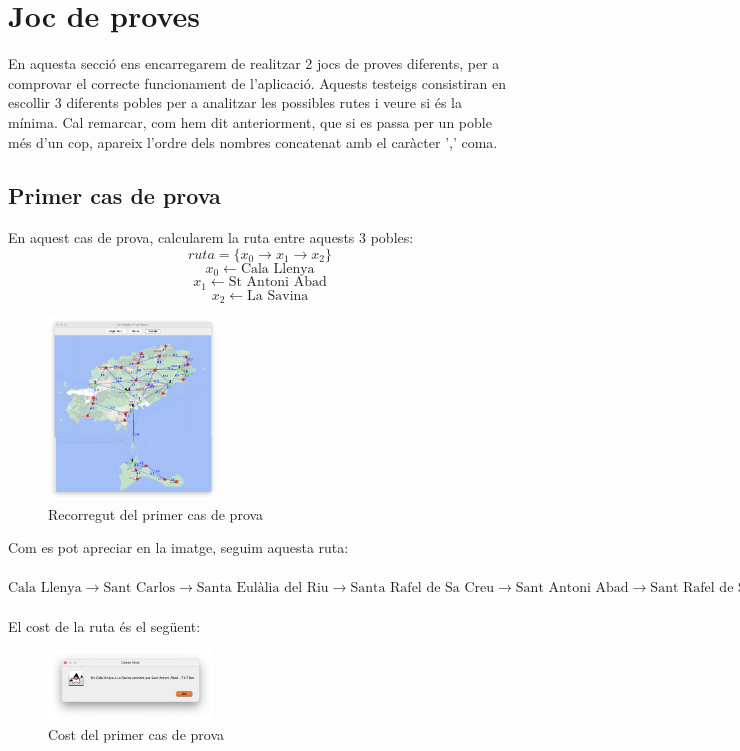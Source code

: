 \documentclass[conference]{IEEEtran}
\begin{document}
\section{Joc de proves}
    En aquesta secció ens encarregarem de realitzar 2 jocs de proves diferents, per a comprovar el correcte funcionament de l'aplicació. Aquests testeigs consistiran en escollir 3 diferents pobles per a analitzar les possibles rutes i veure si és la mínima. Cal remarcar, com hem dit anteriorment, que si es passa per un poble més d'un cop, apareix l'ordre dels nombres concatenat amb el caràcter ',' coma.
    \subsection{Primer cas de prova}
    En aquest cas de prova, calcularem la ruta entre aquests 3 pobles:
    $$ruta=\{x_{0}\rightarrow x_{1}\rightarrow x_{2}\}$$
    $$x_{0}\gets \textrm{Cala Llenya}$$
    $$x_{1}\gets \textrm{St Antoni Abad}$$
    $$x_{2}\gets \textrm{La Savina}$$

    \begin{figure}[ht]
        \centering
        \includegraphics[width=0.4\textwidth]{images/cami_1.png}
        \caption{Recorregut del primer cas de prova}
    \end{figure}

    Com es pot apreciar en la imatge, seguim aquesta ruta:\\\\
    $\textrm{Cala Llenya} \rightarrow \textrm{Sant Carlos} \rightarrow \textrm{Santa Eulàlia del Riu} \rightarrow \textrm{Santa Rafel de Sa Creu} \rightarrow \textrm{Sant Antoni Abad} \rightarrow \textrm{Sant Rafel de Sa Creu} \rightarrow \textrm{Puig d'en Valls} \rightarrow \textrm{Ibiza} \rightarrow \textrm{La Savina}$\\\\
    El cost de la ruta és el següent:

    \begin{figure}[ht]
        \centering
        \includegraphics[width=0.388\textwidth]{images/cost1.png}
        \caption{Cost del primer cas de prova}
    \end{figure}
\end{document}
